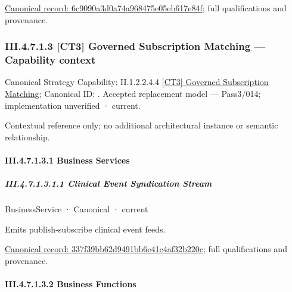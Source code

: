 {\footnotesize \href{../../../../continuum/business/business-function/6c9090a3d0a74a968475e05eb617e84f.md}{Canonical record: 6c9090a3d0a74a968475e05eb617e84f}; full qualifications and provenance.}\par
\subsubsection*{III.4.7.1.3 [CT3] Governed Subscription Matching — Capability context}
\label{navigation:III.4.7.1.3}

{\small Canonical Strategy Capability: II.1.2.2.4.4 \hyperref[element:0f79a2e62740435b9bef0f662838ab16]{[CT3] Governed Subscription Matching}; Canonical ID: \texttt{}. Accepted replacement model — Pass3/014; implementation unverified · current.}\par
Contextual reference only; no additional architectural instance or semantic relationship.\par
\paragraph*{III.4.7.1.3.1 Business Services}
\label{navigation:III.4.7.1.3.1}

\subparagraph*{III.4.7.1.3.1.1 Clinical Event Syndication Stream}
\label{navigation:III.4.7.1.3.1.1}

\label{element:337f39bb62d9491bb6e41c4af32b220c}
{\small BusinessService · Canonical · current}\par

Emits publish-subscribe clinical event feeds.


{\footnotesize \href{../../../../continuum/business/business-service/337f39bb62d9491bb6e41c4af32b220c.md}{Canonical record: 337f39bb62d9491bb6e41c4af32b220c}; full qualifications and provenance.}\par
\paragraph*{III.4.7.1.3.2 Business Functions}
\label{navigation:III.4.7.1.3.2}

